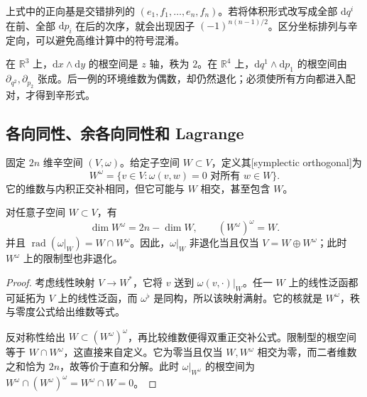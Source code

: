 上式中的正向基是交错排列的 \((e_1,f_1,\ldots,e_n,f_n)\)。若将体积形式改写成全部 \(\mathrm{d}q^i\) 在前、全部 \(\mathrm{d}p_i\) 在后的次序，就会出现因子 \((-1)^{n(n-1)/2}\)。区分坐标排列与辛定向，可以避免高维计算中的符号混淆。

\begin{example}\label{g4:exm:0701:degenerate-form}
	在 \(\mathbb R^3\) 上，\(\mathrm{d}x\wedge\mathrm{d}y\) 的根空间是 \(z\) 轴，秩为 \(2\)。在 \(\mathbb R^4\) 上，\(\mathrm{d}q^1\wedge\mathrm{d}p_1\) 的根空间由 \(\partial_{q^2},\partial_{p_2}\) 张成。后一例的环境维数为偶数，却仍然退化；必须使所有方向都进入配对，才得到辛形式。
\end{example}

\subsection{各向同性、余各向同性和 Lagrange}
\label{g4:subsec:0701:02}

固定 \(2n\) 维辛空间 \((V,\omega)\)。给定子空间 \(W\subset V\)，定义其[symplectic orthogonal]为
\[
	W^\omega=\{v\in V:\omega(v,w)=0\text{ 对所有 }w\in W\}.
\]
它的维数与内积正交补相同，但它可能与 \(W\) 相交，甚至包含 \(W\)。

\begin{proposition}\label{g4:prop:0701:orthogonal-dimensions}
	对任意子空间 \(W\subset V\)，有
	\begin{equation}\label{g4:eq:0701:orthogonal-dimensions}
		\dim W^\omega=2n-\dim W,
		\qquad (W^\omega)^\omega=W.
	\end{equation}
	并且 \(\operatorname{rad}(\omega|_W)=W\cap W^\omega\)。因此，\(\omega|_W\) 非退化当且仅当 \(V=W\oplus W^\omega\)；此时 \(W^\omega\) 上的限制型也非退化。
\end{proposition}
\begin{proof}
	考虑线性映射 \(V\to W^*\)，它将 \(v\) 送到 \(\omega(v,\cdot)|_W\)。任一 \(W\) 上的线性泛函都可延拓为 \(V\) 上的线性泛函，而 \(\omega^\flat\) 是同构，所以该映射满射。它的核就是 \(W^\omega\)，秩与零度公式给出维数等式。

	反对称性给出 \(W\subset(W^\omega)^\omega\)，再比较维数便得双重正交补公式。限制型的根空间等于 \(W\cap W^\omega\)，这直接来自定义。它为零当且仅当 \(W,W^\omega\) 相交为零，而二者维数之和恰为 \(2n\)，故等价于直和分解。此时 \(\omega|_{W^\omega}\) 的根空间为 \(W^\omega\cap(W^\omega)^\omega=W^\omega\cap W=0\)。
\end{proof}

